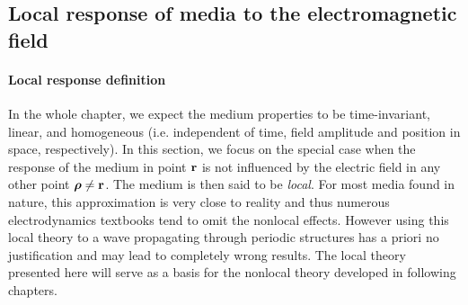\subsection{Local response of media to the electromagnetic field} \label{loc_response_of_media}
\paragraph{Local response definition} \label{subsection_local_resp} %
In the whole chapter, we expect the medium properties to be time-invariant, linear, and homogeneous (i.e. independent of time, field amplitude and position in space, respectively). 
In this section, we focus on the special case when the response of the medium in point ${\mathbf{r}}$ is not influenced by the electric field in any other point $\boldsymbol{\rho} \neq {\mathbf{r}}$. The medium is then said to be \textit{local}. 
For most media found in nature, this approximation is very close to reality and thus numerous electrodynamics textbooks tend to omit the nonlocal effects. 
However using this local theory to a wave propagating through periodic structures has a priori no justification and may lead to completely wrong results. The local theory presented here will serve as a basis for the nonlocal theory developed in following chapters.

